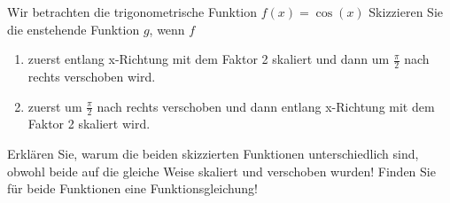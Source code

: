 \item Wir betrachten die trigonometrische Funktion $f(x)=\cos(x)$ Skizzieren Sie die enstehende Funktion $g$, wenn $f$

\begin{enumerate}
\item zuerst entlang x-Richtung mit dem Faktor 2 skaliert und dann um $\frac{\pi}{2}$ nach rechts verschoben wird.
\item zuerst um $\frac{\pi}{2}$ nach rechts verschoben und dann entlang x-Richtung mit dem Faktor 2 skaliert wird.
\end{enumerate}

Erklären Sie, warum die beiden skizzierten Funktionen unterschiedlich sind, obwohl beide auf die gleiche Weise skaliert und verschoben wurden! Finden Sie für beide Funktionen eine Funktionsgleichung!
